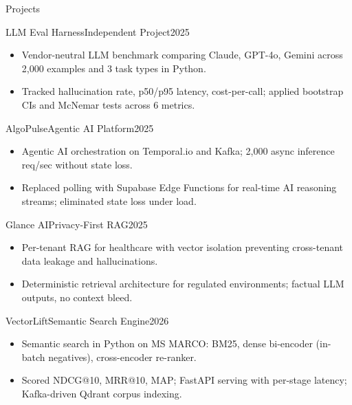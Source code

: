 \documentclass[]{mcdowellcv}
\begin{document}
\begin{cvsection}{Projects}
  \begin{cvsubsection}{LLM Eval Harness}{Independent Project}{2025}
    \begin{itemize}
      \item Vendor-neutral LLM benchmark comparing Claude, GPT-4o, Gemini across 2,000 examples and 3 task types in Python.
      \item Tracked hallucination rate, p50/p95 latency, cost-per-call; applied bootstrap CIs and McNemar tests across 6 metrics.
    \end{itemize}
    \vspace{-1.5pt}
  \end{cvsubsection}

  \begin{cvsubsection}{AlgoPulse}{Agentic AI Platform}{2025}
    \begin{itemize}
      \item Agentic AI orchestration on Temporal.io and Kafka; 2,000 async inference req/sec without state loss.
      \item Replaced polling with Supabase Edge Functions for real-time AI reasoning streams; eliminated state loss under load.
    \end{itemize}
    \vspace{-1.5pt}
  \end{cvsubsection}

  \begin{cvsubsection}{Glance AI}{Privacy-First RAG}{2025}
    \begin{itemize}
      \item Per-tenant RAG for healthcare with vector isolation preventing cross-tenant data leakage and hallucinations.
      \item Deterministic retrieval architecture for regulated environments; factual LLM outputs, no context bleed.
    \end{itemize}
    \vspace{-1.5pt}
  \end{cvsubsection}

  \begin{cvsubsection}{VectorLift}{Semantic Search Engine}{2026}
    \begin{itemize}
      \item Semantic search in Python on MS MARCO: BM25, dense bi-encoder (in-batch negatives), cross-encoder re-ranker.
      \item Scored NDCG@10, MRR@10, MAP; FastAPI serving with per-stage latency; Kafka-driven Qdrant corpus indexing.
    \end{itemize}
  \end{cvsubsection}
\end{cvsection}
\end{document}
